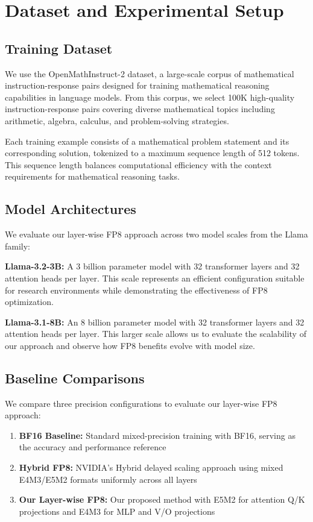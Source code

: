 \section{Dataset and Experimental Setup}

\subsection{Training Dataset}
We use the OpenMathInstruct-2 dataset, a large-scale corpus of mathematical instruction-response pairs designed for training mathematical reasoning capabilities in language models. From this corpus, we select 100K high-quality instruction-response pairs covering diverse mathematical topics including arithmetic, algebra, calculus, and problem-solving strategies.

Each training example consists of a mathematical problem statement and its corresponding solution, tokenized to a maximum sequence length of 512 tokens. This sequence length balances computational efficiency with the context requirements for mathematical reasoning tasks.

\subsection{Model Architectures}
We evaluate our layer-wise FP8 approach across two model scales from the Llama family:

\textbf{Llama-3.2-3B:} A 3 billion parameter model with 32 transformer layers and 32 attention heads per layer. This scale represents an efficient configuration suitable for research environments while demonstrating the effectiveness of FP8 optimization.

\textbf{Llama-3.1-8B:} An 8 billion parameter model with 32 transformer layers and 32 attention heads per layer. This larger scale allows us to evaluate the scalability of our approach and observe how FP8 benefits evolve with model size.

\subsection{Baseline Comparisons}
We compare three precision configurations to evaluate our layer-wise FP8 approach:

\begin{enumerate}
\item \textbf{BF16 Baseline:} Standard mixed-precision training with BF16, serving as the accuracy and performance reference
\item \textbf{Hybrid FP8:} NVIDIA's Hybrid delayed scaling approach using mixed E4M3/E5M2 formats uniformly across all layers
\item \textbf{Our Layer-wise FP8:} Our proposed method with E5M2 for attention Q/K projections and E4M3 for MLP and V/O projections
\end{enumerate}